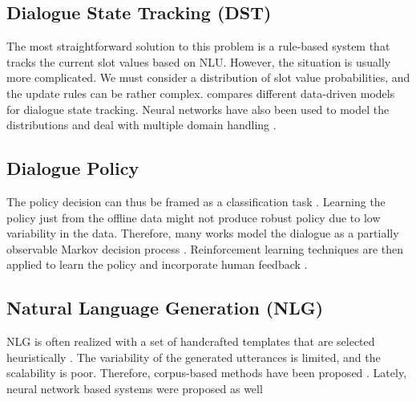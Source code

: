 \subsection{Dialogue State Tracking (DST)} 
\label{relwork:DST}
The most straightforward solution to this problem is a rule-based system that tracks the current slot values based on NLU.
However, the situation is usually more complicated.
We must consider a distribution of slot value probabilities, and the update rules can be rather complex.
\citet{vzilka2013comparison} compares different data-driven models for dialogue state tracking.
Neural networks have also been used to model the distributions \cite{mrkvsic2016neural, zhong2018global} and deal with multiple domain handling \cite{rastogi2017scalable}.

\subsection{Dialogue Policy}
\label{relwork:policy}
The policy decision can thus be framed as a classification task \cite{gavsic2013gaussian}.
Learning the policy just from the offline data might not produce robust policy due to low variability in the data.
Therefore, many works model the dialogue as a partially observable Markov decision process \cite{gavsic2010gaussian, thomson2010bayesian}.
Reinforcement learning techniques are then applied to learn the policy and incorporate human feedback \cite{peng2017composite, su2016line}.

\subsection{Natural Language Generation (NLG)}
NLG is often realized with a set of handcrafted templates that are selected heuristically \cite{rudnicky_creating_1999}.
The variability of the generated utterances is limited, and the scalability is poor.
Therefore, corpus-based methods have been proposed \cite{oh2000stochastic, mairesse-young-2014-stochastic}.
Lately, neural network based systems were proposed as well \cite{wen-etal-2015-semantically, wen-etal-2016-multi}

